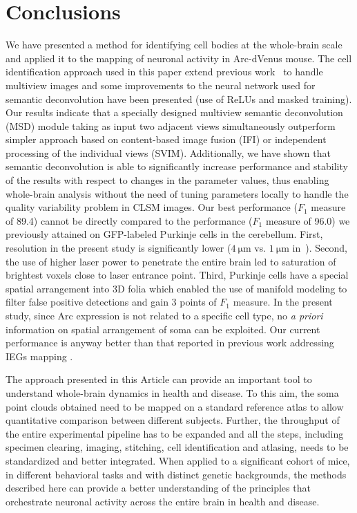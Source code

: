 \documentclass[smallextended]{svjour3}       %
\begin{document}
\section{Conclusions}
We have presented a method for identifying cell bodies at the
whole-brain scale and applied it to the mapping of neuronal activity
in Arc-dVenus mouse. The cell identification approach used in this
paper extend previous work~\cite{frasconi_large-scale_2014} to handle
multiview images and some improvements to the neural network used for
semantic deconvolution have been presented (use of ReLUs and 
masked training). Our results indicate that a specially designed multiview
semantic deconvolution (MSD) module taking as input two adjacent views
simultaneously outperform simpler approach based on content-based
image fusion (IFI) or independent processing of the individual views
(SVIM). Additionally, we have shown that semantic deconvolution is
able to significantly increase performance and stability of the
results with respect to changes in the parameter values, thus enabling
whole-brain analysis without the need of tuning parameters locally to
handle the quality variability problem in CLSM images. Our best
performance ($F_1$ measure of 89.4) cannot be directly compared to the
performance ($F_1$ measure of 96.0) we previously attained on
GFP-labeled Purkinje cells in the cerebellum. First, resolution in the
present study is significantly lower ($\SI{4}{\micro\meter}$
vs. $\SI{1}{\micro\meter}$
in~\cite{frasconi_large-scale_2014}). Second, the use of higher laser power
to penetrate the entire brain led to saturation of brightest voxels close to laser
entrance point.
Third, Purkinje cells have a special spatial arrangement
into 3D folia which enabled the use of manifold modeling to filter
false positive detections and gain 3 points of $F_1$ measure. In the present study,
since Arc expression is not related to a specific cell type, no \emph{a priori}
information on spatial arrangement of soma can be exploited. Our current performance
is anyway better than that reported in previous work addressing IEGs mapping \cite{kim_mapping_2015}.

The approach presented in this Article can provide an important tool to
understand whole-brain dynamics in health and disease. To this aim, the soma
point clouds obtained need to be mapped on a standard reference atlas
to allow quantitative comparison between different subjects. Further, the throughput of the entire
experimental pipeline has to be expanded and all the steps, including specimen clearing, imaging, stitching, cell identification
and atlasing, needs to be standardized and better integrated.
When applied to a significant cohort of mice, in different behavioral tasks and with
distinct genetic backgrounds, the methods described here can provide a better understanding
of the principles that orchestrate
neuronal activity across the entire brain in health and disease.
\end{document}
